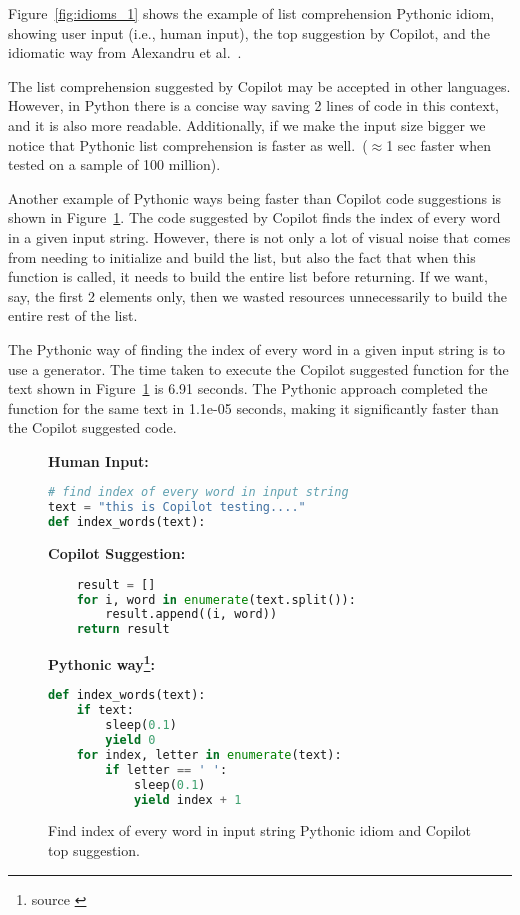 Figure~\ref{fig:idioms_1} shows the example of list comprehension Pythonic idiom, showing user input (i.e., human input), the top suggestion by Copilot, and the idiomatic way from Alexandru et al.~\cite{Alexandru2018}.

The list comprehension suggested by Copilot may be accepted in other languages. 
However, in Python there is a concise way saving 2 lines of code in this context, and it is also more readable. 
Additionally, if we make the input size bigger we notice that Pythonic list comprehension is faster as well.~($\approx$1 sec faster when tested on a sample of 100 million).

Another example of Pythonic ways being faster than Copilot code suggestions is shown in Figure~\ref{fig:idioms_3}.
The code suggested by Copilot finds the index of every word in a given input string. 
However, there is not only a lot of visual noise that comes from needing to initialize and build the list, but also the fact that when this function is called, it needs to build the entire list before returning. 
If we want, say, the first 2 elements only, then we wasted resources unnecessarily to build the entire rest of the list.

The Pythonic way of finding the index of every word in a given input string is to use a generator. 
The time taken to execute the Copilot suggested function for the text shown in Figure~\ref{fig:idioms_3} is 6.91 seconds. The Pythonic approach completed the function for the same text in 1.1e-05 seconds, making it significantly faster than the Copilot suggested code.

\begin{figure}[hbt!]
    \centering
\begin{tcolorbox}[title=Find index of every word in input string,boxsep=.25mm]
\textbf{Human Input:}
\begin{lstlisting}[language={Python}, keywords={yield}]
# find index of every word in input string
text = "this is Copilot testing...."
def index_words(text):
\end{lstlisting}
\tcbline
\textbf{Copilot Suggestion:}
\begin{lstlisting}[language=Python,escapechar=\%]
% \noindent\textcolor{gray}{def index\_words(text):} %
    result = []
    for i, word in enumerate(text.split()):
		result.append((i, word))
	return result
\end{lstlisting}
\tcbline
\textbf{Pythonic way\footnote{source \cite{Alexandru2018}}:}
\begin{lstlisting}[language=Python, keywords={def, if, for, in, yield}]
def index_words(text):
    if text:
        sleep(0.1)
        yield 0
    for index, letter in enumerate(text):
        if letter == ' ':
            sleep(0.1)
            yield index + 1
\end{lstlisting}
\end{tcolorbox}
    \caption{Find index of every word in input string Pythonic idiom and Copilot top suggestion.}
    \label{fig:idioms_3}
\end{figure}

